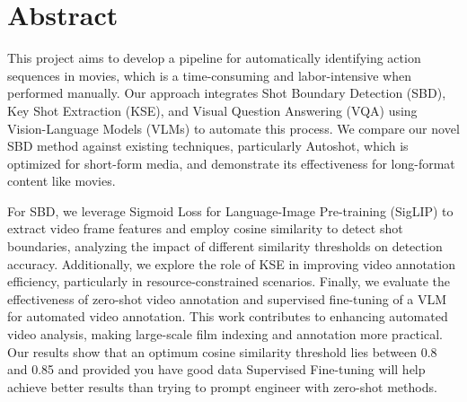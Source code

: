 \documentclass[12pt]{report}
\begin{document}
	\section*{Abstract}
	\fontsize{12}{15}\selectfont  %
	\noindent %
	This project aims to develop a pipeline for automatically identifying action sequences in movies, which is a time-consuming and labor-intensive when performed manually. Our approach integrates Shot Boundary Detection (SBD), Key Shot Extraction (KSE), and Visual Question Answering (VQA) using Vision-Language Models (VLMs) to automate this process. We compare our novel SBD method against existing techniques, particularly Autoshot, which is optimized for short-form media, and demonstrate its effectiveness for long-format content like movies.
	
	For SBD, we leverage Sigmoid Loss for Language-Image Pre-training (SigLIP) to extract video frame features and employ cosine similarity to detect shot boundaries, analyzing the impact of different similarity thresholds on detection accuracy. Additionally, we explore the role of KSE in improving video annotation efficiency, particularly in resource-constrained scenarios. Finally, we evaluate the effectiveness of zero-shot video annotation and supervised fine-tuning of a VLM for automated video annotation. This work contributes to enhancing automated video analysis, making large-scale film indexing and annotation more practical. Our results show that an optimum cosine similarity threshold lies between 0.8 and 0.85 and provided you have good data Supervised Fine-tuning will help achieve better results than trying to prompt engineer with zero-shot methods.
	
	\begingroup  %
	\renewcommand{\addcontentsline}[3]{}
	\newpage
	\tableofcontents  %
	\newpage
	
	\listoffigures
	\newpage
	
	\listoftables
	\newpage
	
\end{document}
